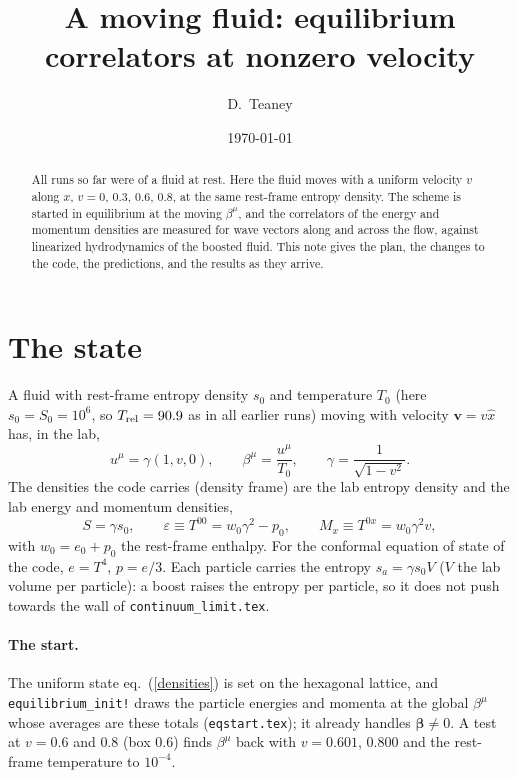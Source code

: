 \documentclass[11pt,aps,preprint,nofootinbib,superscriptaddress,tightenlines]{revtex4-2}
\def\st{\begin{equation}}
\def\stp{\end{equation}}
\def\Eq#1{eq.~(\ref{#1})}
\let\oldparagraph\paragraph
\renewcommand{\paragraph}{\par\bigskip\oldparagraph}
\begin{document}
\title{A moving fluid: equilibrium correlators at nonzero velocity}
\author{D.~Teaney}
\date{\today}

\begin{abstract}
All runs so far were of a fluid at rest.  Here the fluid moves with a uniform velocity $v$
along $x$, $v=0$, $0.3$, $0.6$, $0.8$, at the same rest-frame entropy density.  The scheme is
started in equilibrium at the moving $\beta^\mu$, and the correlators of the energy and
momentum densities are measured for wave vectors along and across the flow, against
linearized hydrodynamics of the boosted fluid.  This note gives the plan, the changes to the
code, the predictions, and the results as they arrive.
\end{abstract}

\maketitle

\section{The state}
\label{sec:state}

A fluid with rest-frame entropy density $s_0$ and temperature $T_0$ (here $s_0=S_0=10^6$, so
$T_{\rm rel}=90.9$ as in all earlier runs) moving with velocity $\bm v=v\hat x$ has, in the lab,
\st
u^\mu=\gamma(1,v,0),\qquad
\beta^\mu=\frac{u^\mu}{T_0},\qquad \gamma=\frac{1}{\sqrt{1-v^2}} .
\stp
The densities the code carries (density frame) are the lab entropy density and the lab
energy and momentum densities,
\st
S=\gamma s_0,\qquad
\varepsilon\equiv T^{00}=w_0\gamma^2-p_0,\qquad
M_x\equiv T^{0x}=w_0\gamma^2v,
\label{densities}
\stp
with $w_0=e_0+p_0$ the rest-frame enthalpy.  For the conformal equation of state of the code,
$e=T^4$, $p=e/3$.  Each particle carries the entropy $s_a=\gamma s_0V$ ($V$ the lab volume per
particle): a boost raises the entropy per particle, so it does not push towards the wall of
\texttt{continuum\_limit.tex}.

\paragraph{The start.}  The uniform state \Eq{densities} is set on the hexagonal lattice, and
\texttt{equilibrium\_init!} draws the particle energies and momenta at the global $\beta^\mu$ whose
averages are these totals (\texttt{eqstart.tex}); it already handles $\bm\beta\ne0$.  A test at
$v=0.6$ and $0.8$ (box $0.6$) finds $\beta^\mu$ back with $v=0.601$, $0.800$ and the rest-frame
temperature to $10^{-4}$.
\end{document}
